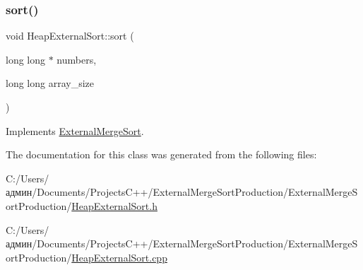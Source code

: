 \hypertarget{class_heap_external_sort_a908087ce13932b268a35e1184a05ea44}{}\label{class_heap_external_sort_a908087ce13932b268a35e1184a05ea44} 
\subsubsection{\texorpdfstring{sort()}{sort()}}
{\footnotesize\ttfamily void Heap\+External\+Sort\+::sort (\begin{DoxyParamCaption}\item[{long long $\ast$}]{numbers,  }\item[{long long}]{array\+\_\+size }\end{DoxyParamCaption})\hspace{0.3cm}{\ttfamily [virtual]}}



Implements \hyperlink{class_external_merge_sort_af6412221cc797a846243a343ccc12dba}{External\+Merge\+Sort}.



The documentation for this class was generated from the following files\+:\begin{DoxyCompactItemize}
\item 
C\+:/\+Users/админ/\+Documents/\+Projects\+C++/\+External\+Merge\+Sort\+Production/\+External\+Merge\+Sort\+Production/\hyperlink{_heap_external_sort_8h}{Heap\+External\+Sort.\+h}\item 
C\+:/\+Users/админ/\+Documents/\+Projects\+C++/\+External\+Merge\+Sort\+Production/\+External\+Merge\+Sort\+Production/\hyperlink{_heap_external_sort_8cpp}{Heap\+External\+Sort.\+cpp}\end{DoxyCompactItemize}
